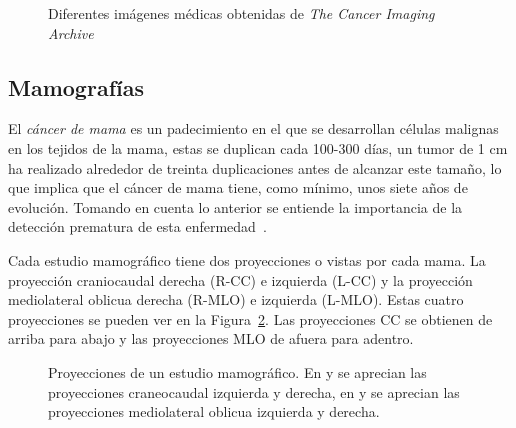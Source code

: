 \begin{figure}[h]
    \centering

    \hspace{1cm}
    \hspace{1cm}

  \caption[Algunos tipos de imágenes médicas]{Diferentes imágenes médicas
  obtenidas de \textit{The Cancer Imaging Archive}}
  
  \label{medicalimages} \end{figure}

\subsection{Mamografías}

El \textit{cáncer de mama} es un padecimiento en el que se desarrollan células
malignas en los tejidos de la mama, estas se duplican cada 100-300 días, un
tumor de 1 cm ha realizado alrededor de treinta duplicaciones antes de alcanzar
este tamaño, lo que implica que el cáncer de mama tiene, como mínimo, unos
siete años de evolución. Tomando en cuenta lo anterior se entiende la
importancia de la detección prematura de esta enfermedad~\cite{mxcancer}.

Cada estudio mamográfico tiene dos proyecciones o vistas por cada mama. La
proyección craniocaudal derecha (R-CC) e izquierda (L-CC) y la proyección
mediolateral oblicua derecha (R-MLO) e izquierda (L-MLO). Estas cuatro
proyecciones se pueden ver en la Figura~\ref{fig:views}. Las proyecciones CC se
obtienen de arriba para abajo y las proyecciones MLO de afuera para adentro.

\begin{figure}[h]
    \centering

    \hspace{1cm}

    \bigskip

    \hspace{1cm}

  \caption[Proyecciones de un estudio mamográfico]{Proyecciones de un estudio
  mamográfico. En \protect{} y \protect{} se aprecian las
  proyecciones craneocaudal izquierda y derecha, en \protect{} y
  \protect{} se aprecian las proyecciones mediolateral oblicua
  izquierda y derecha.}
  
  \label{fig:views}
\end{figure}

